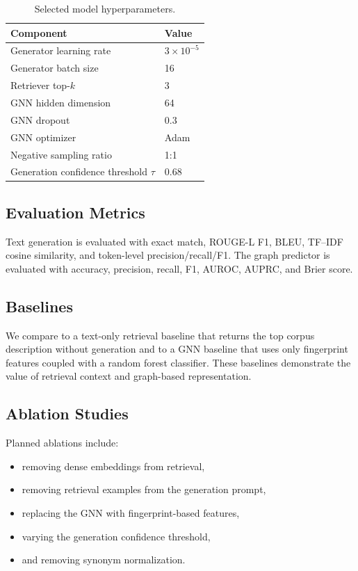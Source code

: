 \documentclass[conference]{IEEEtran}
\begin{document}
\begin{table}[t]
    \centering
    \caption{Selected model hyperparameters.}
    \label{tab:hyperparameters}
    \begin{tabular}{@{}ll@{}}
    \toprule
    Component & Value \\
    \midrule
    Generator learning rate & $3\times 10^{-5}$ \\
    Generator batch size & 16 \\
    Retriever top-$k$ & 3 \\
    GNN hidden dimension & 64 \\
    GNN dropout & 0.3 \\
    GNN optimizer & Adam \\
    Negative sampling ratio & 1:1 \\
    Generation confidence threshold $\tau$ & 0.68 \\
    \bottomrule
    \end{tabular}
\end{table}

\subsection{Evaluation Metrics}
Text generation is evaluated with exact match, ROUGE-L F1, BLEU, TF--IDF cosine similarity, and token-level precision/recall/F1. The graph predictor is evaluated with accuracy, precision, recall, F1, AUROC, AUPRC, and Brier score.

\subsection{Baselines}
We compare to a text-only retrieval baseline that returns the top corpus description without generation and to a GNN baseline that uses only fingerprint features coupled with a random forest classifier. These baselines demonstrate the value of retrieval context and graph-based representation.

\subsection{Ablation Studies}
Planned ablations include:
\begin{itemize}
    \item removing dense embeddings from retrieval,
    \item removing retrieval examples from the generation prompt,
    \item replacing the GNN with fingerprint-based features,
    \item varying the generation confidence threshold,
    \item and removing synonym normalization.
\end{itemize}
\end{document}
